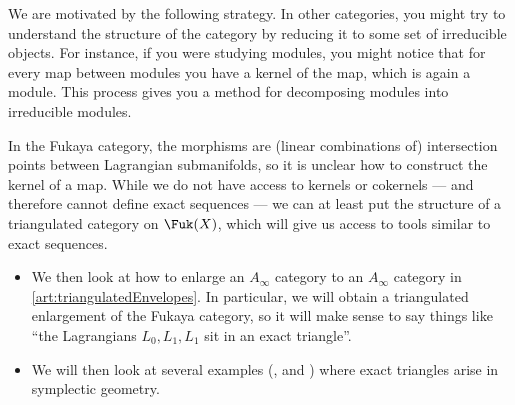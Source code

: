 \begin{exposition}
We are motivated by the following strategy.
In other categories, you might try to understand the structure of the category by reducing it to some set of irreducible objects. For instance, if you were studying modules, you might notice that for every map between modules you have a kernel of the map, which is again a module. This process gives you a method for decomposing modules into irreducible modules. 

In the Fukaya category, the morphisms are (linear combinations of) intersection points between Lagrangian submanifolds, so it is unclear how to construct the kernel of a map.
While we do not have access to kernels or cokernels --- and therefore cannot define exact sequences --- we can at least put the structure of a triangulated category on $\Fuk(X)$, which will give us access to tools similar to exact sequences. 

\begin{itemize}
    \item We then look at how to enlarge an $A_\infty$ category to an $A_\infty$ category in \cref{art:triangulatedEnvelopes}. In particular, we will obtain a triangulated enlargement of the Fukaya category, so it will make sense to say things like ``the Lagrangians $L_0, L_1, L_1$ sit in an exact triangle''.
    \item We will then look at several examples (, and ) where exact triangles arise in symplectic geometry.
\end{itemize}







    \end{exposition}